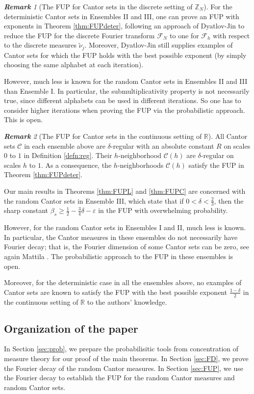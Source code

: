 \documentclass[12pt,reqno]{amsart}
\newcommand\Cc{\mathcal{C}}
\newcommand\Fc{\mathcal{F}}
\newcommand\R{\mathbb{R}}
\newcommand\ve{\varepsilon}
\newcommand\Z{\mathbb{Z}}
\theoremstyle{plain}
\theoremstyle{remark}
\newtheorem*{rmk}{\textbf{Remark}}
\numberwithin{equation}{section}
\begin{document}
\begin{rmk}[The FUP for Cantor sets in the discrete setting of $\Z_N$]
For the deterministic Cantor sets in Ensembles II and III, one can prove an FUP with exponents in Theorem \ref{thm:FUPdeter}, following an approach of Dyatlov-Jin \cite{DJ2} to reduce the FUP for the discrete Fourier transform $\Fc_N$ to one for $\Fc_h$ with respect to the discrete measures $\tilde\nu_j$. Moreover, Dyatlov-Jin \cite{DJ1} still supplies examples of Cantor sets for which the FUP holds with the best possible exponent (by simply choosing the same alphabet at each iteration).

However, much less is known for the random Cantor sets in Ensembles II and III than Ensemble I. In particular, the submultiplicativity property is not necessarily true, since different alphabets can be used in different iterations. So one has to consider higher iterations when proving the FUP via the probabilistic approach. This is open.
\end{rmk}

\begin{rmk}[The FUP for Cantor sets in the continuous setting of $\R$]
All Cantor sets $\Cc$ in each ensemble above are $\delta$-regular with an absolute constant $R$ on scales $0$ to $1$ in Definition \ref{defn:reg}. Their $h$-neighborhood $\Cc(h)$ are $\delta$-regular on scales $h$ to $1$. As a consequence, the $h$-neighborhoods $\Cc(h)$ satisfy the FUP in Theorem \ref{thm:FUPdeter}. 

Our main results in Theorems \ref{thm:FUPL} and \ref{thm:FUPC} are concerned with the random Cantor sets in Ensemble III, which state that if $0<\delta<\frac23$, then the sharp constant $\beta_s\ge\frac12-\frac34\delta-\ve$ in the FUP with overwhelming probability. 

However, for the random Cantor sets in Ensembles I and II, much less is known. In particular, the Cantor measures in these ensembles do not necessarily have Fourier decay; that is, the Fourier dimension of some Cantor sets can be zero, see again Mattila \cite[Chapter 12]{M}. The probabilistic approach to the FUP in these ensembles is open.

Moreover, for the deterministic case in all the ensembles above, no examples of Cantor sets are known to satisfy the FUP with the best possible exponent $\frac{1-\delta}{2}$ in the continuous setting of $\R$ to the authors' knowledge.
\end{rmk}



\subsection{Organization of the paper}
In Section \ref{sec:prob}, we prepare the probabilisitic tools from concentration of measure theory for our proof of the main theorems. In Section \ref{sec:FD}, we prove the Fourier decay of the random Cantor measures. In Section \ref{sec:FUP}, we use the Fourier decay to establish the FUP for the random Cantor measures and random Cantor sets.
\end{document}
